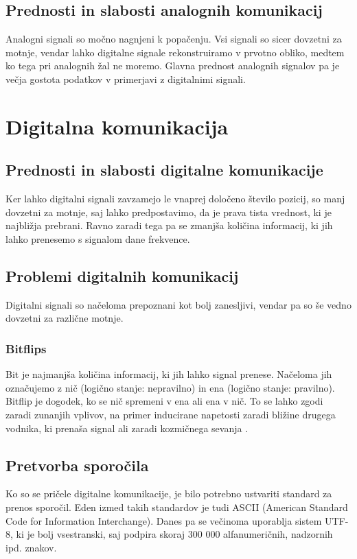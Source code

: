 \documentclass[12pt]{article}
\begin{document}
    \subsection{Prednosti in slabosti analognih komunikacij}
        Analogni signali so močno nagnjeni k popačenju. Vsi signali so sicer 
        dovzetni za motnje, vendar lahko digitalne signale rekonstruiramo v 
        prvotno obliko, medtem ko tega pri analognih žal ne moremo. Glavna 
        prednost analognih signalov pa je večja gostota podatkov v primerjavi z
        digitalnimi signali.

\newpage
\section{Digitalna komunikacija}
    \subsection{Prednosti in slabosti digitalne komunikacije}
        Ker lahko digitalni signali zavzamejo le vnaprej določeno število 
        pozicij, so manj dovzetni za motnje, saj lahko predpostavimo, da je 
        prava tista vrednost, ki je najbližja prebrani. Ravno zaradi tega pa se 
        zmanjša količina informacij, ki jih lahko prenesemo s signalom dane 
        frekvence.
    \subsection{Problemi digitalnih komunikacij}
        Digitalni signali so načeloma prepoznani kot bolj zanesljivi, vendar pa
        so še vedno dovzetni za različne motnje.
        \subsubsection{Bitflips}
            Bit je najmanjša količina informacij, ki jih lahko signal prenese. 
            Načeloma jih označujemo z nič (logično stanje: nepravilno) in ena 
            (logično stanje: pravilno). Bitflip je dogodek, ko se nič spremeni v
            ena ali ena v nič. To se lahko zgodi zaradi zunanjih vplivov, na 
            primer inducirane napetosti zaradi bližine drugega vodnika, ki 
            prenaša signal ali zaradi kozmičnega sevanja 
            \cite{veritasium_computers}.
    \subsection{Pretvorba sporočila} 
        Ko so se pričele digitalne komunikacije, je bilo potrebno ustvariti
        standard za prenos sporočil. Eden izmed takih standardov je tudi ASCII
        (American Standard Code for Information Interchange). Danes pa se
        večinoma uporablja sistem UTF-8, ki je bolj vsestranski, saj podpira
        skoraj 300 000 alfanumeričnih, nadzornih ipd. znakov.
\end{document}
